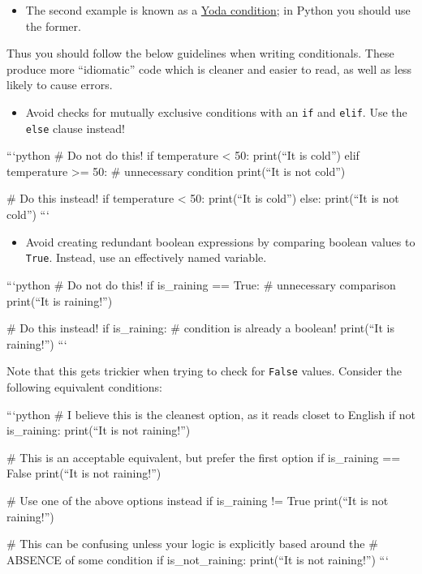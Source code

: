 \documentclass[]{book}
\providecommand{\tightlist}{%
  \setlength{\itemsep}{0pt}\setlength{\parskip}{0pt}}
\begin{document}
\begin{itemize}
\tightlist
\item
  The second example is known as a
  \href{https://en.wikipedia.org/wiki/Yoda_conditions}{Yoda condition};
  in Python you should use the former.
\end{itemize}

Thus you should follow the below guidelines when writing conditionals.
These produce more ``idiomatic'' code which is cleaner and easier to
read, as well as less likely to cause errors.

\begin{itemize}
\tightlist
\item
  Avoid checks for mutually exclusive conditions with an \texttt{if} and
  \texttt{elif}. Use the \texttt{else} clause instead!
\end{itemize}

```python \# Do not do this! if temperature \textless{} 50: print(``It
is cold'') elif temperature \textgreater{}= 50: \# unnecessary condition
print(``It is not cold'')

\# Do this instead! if temperature \textless{} 50: print(``It is cold'')
else: print(``It is not cold'') ```

\begin{itemize}
\tightlist
\item
  Avoid creating redundant boolean expressions by comparing boolean
  values to \texttt{True}. Instead, use an effectively named variable.
\end{itemize}

```python \# Do not do this! if is\_raining == True: \# unnecessary
comparison print(``It is raining!'')

\# Do this instead! if is\_raining: \# condition is already a boolean!
print(``It is raining!'') ```

Note that this gets trickier when trying to check for \texttt{False}
values. Consider the following equivalent conditions:

```python \# I believe this is the cleanest option, as it reads closet
to English if not is\_raining: print(``It is not raining!'')

\# This is an acceptable equivalent, but prefer the first option if
is\_raining == False print(``It is not raining!'')

\# Use one of the above options instead if is\_raining != True
print(``It is not raining!'')

\# This can be confusing unless your logic is explicitly based around
the \# ABSENCE of some condition if is\_not\_raining: print(``It is not
raining!'') ```
\end{document}
